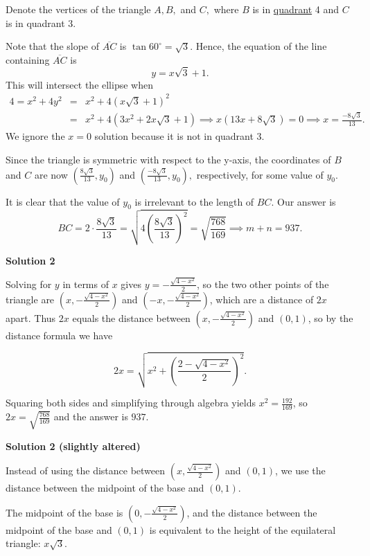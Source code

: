 \begin{enumerate}
Denote the vertices of the triangle $A,B,$ and $C,$ where $B$ is in \href{https://artofproblemsolving.com/wiki/index.php?title=Quadrant}{quadrant} 4 and $C$ is in quadrant $3.$

 Note that the slope of $\overline{AC}$ is $\tan 60^\circ = \sqrt {3}.$ Hence, the equation of the line containing $\overline{AC}$ is
 \[y = x\sqrt {3} + 1.\]This will intersect the ellipse when
 \begin{eqnarray*}4 = x^{2} + 4y^{2} & = & x^{2} + 4(x\sqrt {3} + 1)^{2} \\ & = & x^{2} + 4(3x^{2} + 2x\sqrt {3} + 1) \implies x(13x+8\sqrt 3)=0\implies x = \frac { - 8\sqrt {3}}{13}. \end{eqnarray*}We ignore the $x=0$ solution because it is not in quadrant 3.

 Since the triangle is symmetric with respect to the y-axis, the coordinates of $B$ and $C$ are now $\left(\frac {8\sqrt {3}}{13},y_{0}\right)$ and $\left(\frac { - 8\sqrt {3}}{13},y_{0}\right),$ respectively, for some value of $y_{0}.$

 It is clear that the value of $y_{0}$ is irrelevant to the length of $BC$. Our answer is
 \[BC = 2 \cdot \frac {8\sqrt {3}}{13}=\sqrt {4\left(\frac {8\sqrt {3}}{13}\right)^{2}} = \sqrt {\frac {768}{169}}\implies m + n = \boxed{937}.\]




\textbf{Solution 2}

Solving for $y$ in terms of $x$ gives $y= -\frac {\sqrt{4-x^2}}{2}$, so the two other points of the triangle are $(x,-\frac {\sqrt{4-x^2}}{2})$ and $(-x,-\frac {\sqrt{4-x^2}}{2})$, which are a distance of $2x$ apart. Thus $2x$ equals the distance between $(x,-\frac {\sqrt{4-x^2}}{2})$ and $(0,1)$, so by the distance formula we have 

 
 \[2x=\sqrt{x^2+(\frac {2-\sqrt{4-x^2}}{2})^2}.\] 

 Squaring both sides and simplifying through algebra yields $x^2= \frac {192}{169}$, so $2x=\sqrt{\frac{768}{169}}$ and the answer is $\boxed{937}$.

 



\textbf{Solution 2 (slightly altered)}

Instead of using the distance between $(x,\frac {\sqrt{4-x^2}}{2})$ and $(0,1)$, we use the distance between the midpoint of the base and $(0,1)$.

 The midpoint of the base is $(0,-\frac {\sqrt{4-x^2}}{2})$, and the distance between the midpoint of the base and $(0,1)$ is equivalent to the height of the equilateral triangle: $x\sqrt{3}$.


\end{enumerate}
